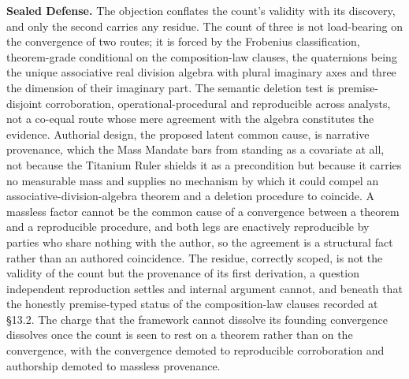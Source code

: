 \documentclass[10pt,twocolumn]{article}
\begin{document}
\textbf{Sealed Defense.} The objection conflates the count's validity
with its discovery, and only the second carries any residue. The count
of three is not load-bearing on the convergence of two routes; it is
forced by the Frobenius classification, theorem-grade conditional on the
composition-law clauses, the quaternions being the unique associative
real division algebra with plural imaginary axes and three the dimension
of their imaginary part. The semantic deletion test is premise-disjoint
corroboration, operational-procedural and reproducible across analysts,
not a co-equal route whose mere agreement with the algebra constitutes
the evidence. Authorial design, the proposed latent common cause, is
narrative provenance, which the Mass Mandate bars from standing as a
covariate at all, not because the Titanium Ruler shields it as a
precondition but because it carries no measurable mass and supplies no
mechanism by which it could compel an associative-division-algebra
theorem and a deletion procedure to coincide. A massless factor cannot
be the common cause of a convergence between a theorem and a
reproducible procedure, and both legs are enactively reproducible by
parties who share nothing with the author, so the agreement is a
structural fact rather than an authored coincidence. The residue,
correctly scoped, is not the validity of the count but the provenance of
its first derivation, a question independent reproduction settles and
internal argument cannot, and beneath that the honestly premise-typed
status of the composition-law clauses recorded at §13.2. The charge that
the framework cannot dissolve its founding convergence dissolves once
the count is seen to rest on a theorem rather than on the convergence,
with the convergence demoted to reproducible corroboration and
authorship demoted to massless provenance.
\end{document}

